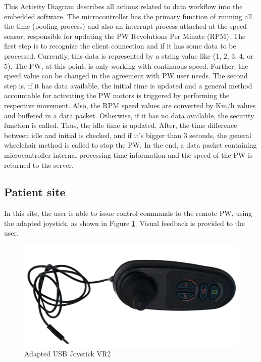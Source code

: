 This Activity Diagram describes all actions related to data workflow into the embedded software. The microcontroller has the primary function of running all the time (pooling process) and also an interrupt process attached at the speed sensor, responsible for updating the PW Revolutions Per Minute (RPM). The first step is to recognize the client connection and if it has some data to be processed. Currently, this data is represented by a string value like (1, 2, 3, 4, or 5)\cite{caetano2018}.  The PW, at this point, is only working with continuous speed. Further, the speed value can be changed in the agreement with PW user needs.  The second step is, if it has data available, the initial time is updated and a general method accountable for activating the PW motors is triggered by performing the respective movement. Also, the RPM speed values are converted by Km/h values and buffered in a data packet. Otherwise, if it has no data available, the security function is called. Thus, the idle time is updated. After, the time difference between idle and initial is checked, and if it's bigger than 3 seconds, the general wheelchair method is called to stop the PW. In the end, a data packet containing microcontroller internal processing time information and the speed of the PW is returned to the server.

\subsection{Patient  site}
\label{sec:controlenv}

In this  site, the user is able to issue control commands to the remote PW, using the adapted joystick, as shown in Figure \ref{fig:USBjoystickvr2}. Visual feedback is provided to the user.

\begin{figure}[!hbt]
\begin{center}
\includegraphics[width=1 \textwidth]{img/cap4/USBjoystickvr2}
\caption{Adapted USB Joystick VR2 \cite{caetano2018}} 
\label{fig:USBjoystickvr2}
\end{center}
\end{figure}

